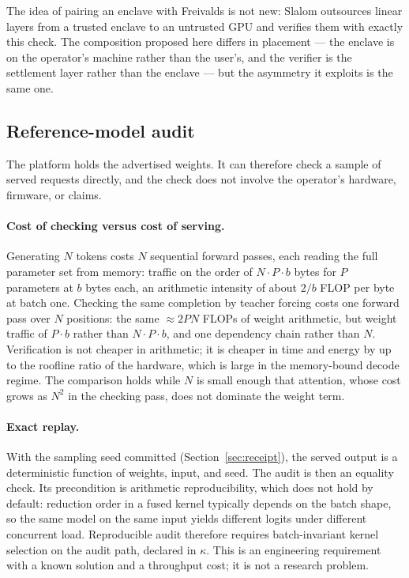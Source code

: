 \documentclass[11pt]{article}
\begin{document}
The idea of pairing an enclave with Freivalds is not new: Slalom \cite{slalom} outsources linear
layers from a trusted enclave to an untrusted GPU and verifies them with exactly this check. The
composition proposed here differs in placement --- the enclave is on the operator's machine rather
than the user's, and the verifier is the settlement layer rather than the enclave --- but the
asymmetry it exploits is the same one.

\subsection{Reference-model audit}

The platform holds the advertised weights. It can therefore check a sample of served requests
directly, and the check does not involve the operator's hardware, firmware, or claims.

\paragraph{Cost of checking versus cost of serving.}
Generating $N$ tokens costs $N$ sequential forward passes, each reading the full parameter set from
memory: traffic on the order of $N \cdot P \cdot b$ bytes for $P$ parameters at $b$ bytes each, an
arithmetic intensity of about $2/b$ FLOP per byte at batch one. Checking the same completion by
teacher forcing costs one forward pass over $N$ positions: the same $\approx 2PN$ FLOPs of weight
arithmetic, but weight traffic of $P \cdot b$ rather than $N \cdot P \cdot b$, and one dependency
chain rather than $N$. Verification is not cheaper in arithmetic; it is cheaper in time and energy
by up to the roofline ratio of the hardware, which is large in the memory-bound decode regime. The
comparison holds while $N$ is small enough that attention, whose cost grows as $N^2$ in the checking
pass, does not dominate the weight term.

\paragraph{Exact replay.}
With the sampling seed committed (Section~\ref{sec:receipt}), the served output is a deterministic
function of weights, input, and seed. The audit is then an equality check. Its precondition is
arithmetic reproducibility, which does not hold by default: reduction order in a fused kernel
typically depends on the batch shape, so the same model on the same input yields different logits
under different concurrent load. Reproducible audit therefore requires batch-invariant kernel
selection on the audit path, declared in $\kappa$. This is an engineering requirement with a known
solution and a throughput cost; it is not a research problem.
\end{document}
